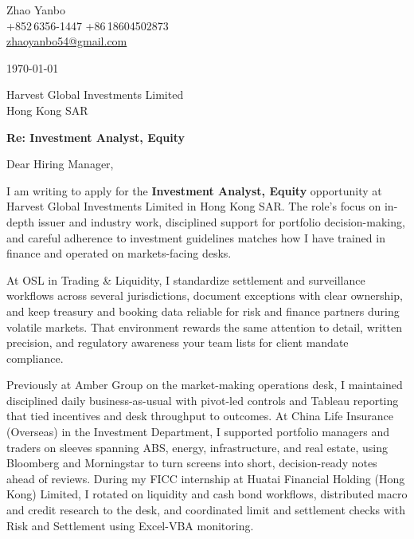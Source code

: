 \documentclass[10pt,a4paper]{article}
\begin{document}
\begin{flushleft}
  Zhao Yanbo\\
  +852\,6356-1447 \;\textbar\; +86\,18604502873\\
  \href{mailto:zhaoyanbo54@gmail.com}{zhaoyanbo54@gmail.com}
\end{flushleft}

\vspace{1em}

\begin{flushright}
  \today
\end{flushright}

\vspace{0.75em}

Harvest Global Investments Limited\\
Hong Kong SAR

\vspace{1em}

\textbf{Re: Investment Analyst, Equity}

\vspace{0.75em}

Dear Hiring Manager,

I am writing to apply for the \textbf{Investment Analyst, Equity} opportunity at Harvest Global Investments Limited in Hong Kong SAR. The role’s focus on in-depth issuer and industry work, disciplined support for portfolio decision-making, and careful adherence to investment guidelines matches how I have trained in finance and operated on markets-facing desks.

At OSL in Trading \& Liquidity, I standardize settlement and surveillance workflows across several jurisdictions, document exceptions with clear ownership, and keep treasury and booking data reliable for risk and finance partners during volatile markets. That environment rewards the same attention to detail, written precision, and regulatory awareness your team lists for client mandate compliance.

Previously at Amber Group on the market-making operations desk, I maintained disciplined daily business-as-usual with pivot-led controls and Tableau reporting that tied incentives and desk throughput to outcomes. At China Life Insurance (Overseas) in the Investment Department, I supported portfolio managers and traders on sleeves spanning ABS, energy, infrastructure, and real estate, using Bloomberg and Morningstar to turn screens into short, decision-ready notes ahead of reviews. During my FICC internship at Huatai Financial Holding (Hong Kong) Limited, I rotated on liquidity and cash bond workflows, distributed macro and credit research to the desk, and coordinated limit and settlement checks with Risk and Settlement using Excel-VBA monitoring.
\end{document}
